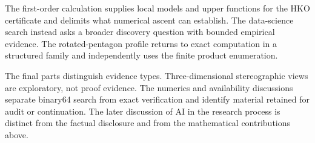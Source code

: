 The first-order calculation supplies local models and upper functions for the
HKO certificate and delimits what numerical ascent can establish.  The
data-science search instead asks a broader discovery question with bounded
empirical evidence.  The rotated-pentagon profile returns to exact computation
in a structured family and independently uses the finite product enumeration.

The final parts distinguish evidence types.  Three-dimensional stereographic
views are exploratory, not proof evidence.  The numerics and availability
discussions separate binary64 search from exact verification and identify
material retained for audit or continuation.  The later discussion of AI in
the research process is distinct from the factual disclosure and from the
mathematical contributions above.

\clearpage
